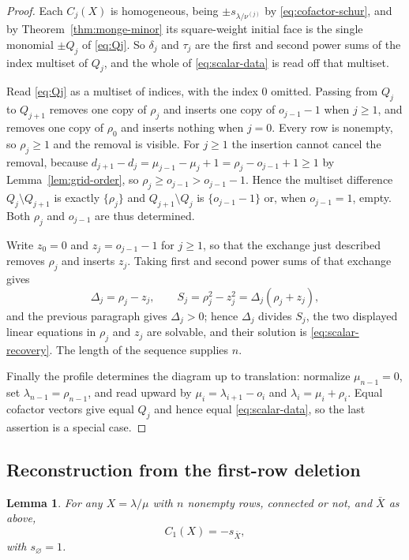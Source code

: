 \documentclass[11pt,a4paper]{amsart}
\numberwithin{equation}{section}
\theoremstyle{plain}
\newtheorem{lemma}[theorem]{Lemma}
\theoremstyle{definition}
\begin{document}
\begin{proof}
Each \(C_j(X)\) is homogeneous, being \(\pm s_{\lambda/\nu^{(j)}}\) by \eqref{eq:cofactor-schur}, and by Theorem~\ref{thm:monge-minor} its square-weight initial face is the single monomial \(\pm Q_j\) of \eqref{eq:Qj}.  So \(\delta_j\) and \(\tau_j\) are the first and second power sums of the index multiset of \(Q_j\), and the whole of \eqref{eq:scalar-data} is read off that multiset.

Read \eqref{eq:Qj} as a multiset of indices, with the index \(0\) omitted.  Passing from \(Q_j\) to \(Q_{j+1}\) removes one copy of \(\rho_j\) and inserts one copy of \(o_{j-1}-1\) when \(j\ge1\), and removes one copy of \(\rho_0\) and inserts nothing when \(j=0\).  Every row is nonempty, so \(\rho_j\ge1\) and the removal is visible.  For \(j\ge1\) the insertion cannot cancel the removal, because \(d_{j+1}-d_j=\mu_{j-1}-\mu_j+1=\rho_j-o_{j-1}+1\ge1\)
by Lemma~\ref{lem:grid-order}, so \(\rho_j\ge o_{j-1}>o_{j-1}-1\).  Hence the multiset difference \(Q_j\setminus Q_{j+1}\) is exactly \(\{\rho_j\}\) and \(Q_{j+1}\setminus Q_j\) is \(\{o_{j-1}-1\}\) or, when \(o_{j-1}=1\), empty.  Both \(\rho_j\) and \(o_{j-1}\) are thus determined.

Write \(z_0=0\) and \(z_j=o_{j-1}-1\) for \(j\ge1\), so that the exchange just described removes \(\rho_j\) and inserts \(z_j\).  Taking first and second power sums of that exchange gives
\[
\Delta_j=\rho_j-z_j,
\qquad
S_j=\rho_j^2-z_j^2=\Delta_j(\rho_j+z_j),
\]
and the previous paragraph gives \(\Delta_j>0\); hence \(\Delta_j\) divides \(S_j\), the two displayed linear equations in \(\rho_j\) and \(z_j\) are solvable, and their solution is \eqref{eq:scalar-recovery}.  The length of the sequence supplies \(n\).

Finally the profile determines the diagram up to translation: normalize \(\mu_{n-1}=0\), set \(\lambda_{n-1}=\rho_{n-1}\), and read upward by \(\mu_i=\lambda_{i+1}-o_i\) and \(\lambda_i=\mu_i+\rho_i\).  Equal cofactor vectors give equal \(Q_j\) and hence equal \eqref{eq:scalar-data}, so the last assertion is a special case.
\end{proof}

\subsection{Reconstruction from the first-row deletion}\label{subsec:child-separation}

\begin{lemma}\label{lem:top-row-cofactor}
For any \(X=\lambda/\mu\) with \(n\) nonempty rows, connected or not, and \(\bar X\) as above,
\[
C_1(X)=-s_{\bar X},
\]
with \(s_\varnothing=1\).
\end{lemma}
\end{document}
